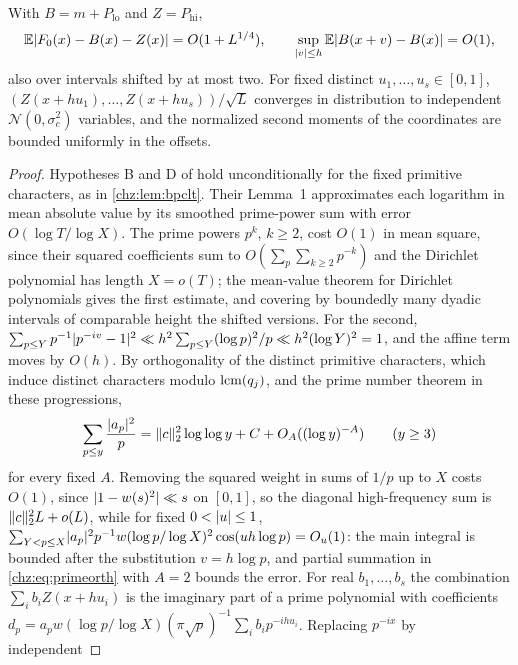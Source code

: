 \begin{lemma}\label{chz:lem:prime}
With $B=m+P_{\mathrm{lo}}$ and $Z=P_{\mathrm{hi}}$,
\begin{equation}\label{chz:eq:primeerr}
 \mathbb{E}\lvert F_0(x)-B(x)-Z(x)\rvert=O(1+L^{1/4}),\qquad \sup_{\lvert v\rvert\le h}\mathbb{E}\lvert B(x+v)-B(x)\rvert=O(1),
\end{equation}
also over intervals shifted by at most two. For fixed distinct $u_1,\dots,u_s\in[0,1]$,
$(Z(x+hu_1),\dots,Z(x+hu_s))/\sqrt L$ converges in distribution to independent $\mathcal N(0,\sigma_c^2)$ variables, and
the normalized second moments of the coordinates are bounded uniformly in the offsets.
\end{lemma}

\begin{proof}
Hypotheses B and D of \cite{BombieriPerelli1998Distinct} hold unconditionally for the fixed primitive
characters, as in \cref{chz:lem:bpclt}. Their Lemma~1 approximates each logarithm in mean absolute value by its
smoothed prime-power sum with error $O(\log T/\log X)$. The prime powers $p^k$, $k\ge2$, cost $O(1)$ in mean
square, since their squared coefficients sum to $O(\sum_p\sum_{k\ge2}p^{-k})$ and the Dirichlet polynomial has
length $X=o(T)$; the mean-value theorem for Dirichlet polynomials gives the first estimate, and covering by
boundedly many dyadic intervals of comparable height the shifted versions. For the second,
$\sum_{p\le Y}p^{-1}\lvert p^{-iv}-1\rvert^2\ll h^2\sum_{p\le Y}(\log p)^2/p\ll h^2(\log Y)^2=1$, and the affine term moves by
$O(h)$. By orthogonality of the distinct primitive characters, which induce distinct characters modulo
$\operatorname{lcm}(q_j)$, and the prime number theorem in these progressions,
\begin{equation}\label{chz:eq:primeorth}
 \sum_{p\le y}\frac{\lvert a_p\rvert^2}p=\lVert c\rVert_2^2\log\log y+C+O_A((\log y)^{-A})\qquad(y\ge3)
\end{equation}
for every fixed $A$. Removing the squared weight in sums of $1/p$ up to $X$ costs $O(1)$, since
$\lvert1-w(s)^2\rvert\ll s$ on $[0,1]$, so the diagonal high-frequency sum is $\lVert c\rVert_2^2L+o(L)$, while for fixed
$0<\lvert u\rvert\le1$, $\sum_{Y<p\le X}\lvert a_p\rvert^2p^{-1}w(\log p/\log X)^2\cos(uh\log p)=O_u(1)$: the main integral is bounded
after the substitution $v=h\log p$, and partial summation in \eqref{chz:eq:primeorth} with $A=2$ bounds the
error. For real $b_1,\dots,b_s$ the combination $\sum_ib_iZ(x+hu_i)$ is the imaginary part of a prime polynomial
with coefficients $d_p=a_pw(\log p/\log X)(\pi\sqrt p)^{-1}\sum_ib_ip^{-ihu_i}$. Replacing $p^{-ix}$ by independent

\end{proof}
